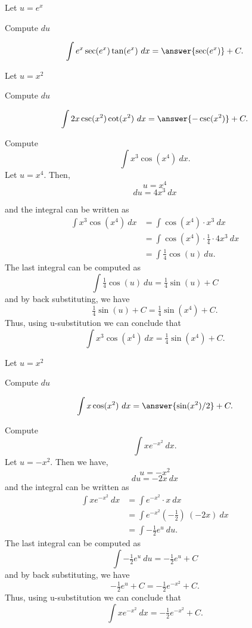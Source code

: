 \documentclass{ximera}
\begin{document}
\begin{problem}
\begin{hint}
Let $u = e^x$
\end{hint}
\begin{hint}
Compute $du$
\end{hint}
\[\int e^x\sec(e^x)\tan(e^x) \ dx = \answer{\sec(e^x)} +C.\]
\end{problem}

\begin{problem}
\begin{hint}
Let $u = x^2$
\end{hint}
\begin{hint}
Compute $du$
\end{hint}
\[\int 2x\csc(x^2)\cot(x^2) \ dx = \answer{-\csc(x^2)} +C.\]
\end{problem}

\begin{example} Compute 
\[\int x^3\cos(x^4) \ dx.\]
Let $u = x^4$.  Then,
\[u = x^4\]
\[du = 4x^3 \ dx\]

and the integral can be written as 
\begin{align*}
\int x^3\cos(x^4) \ dx &= \int \cos(x^4) \cdot x^3\  dx \\
&=  \int \cos(x^4)\cdot \tfrac14 \cdot 4x^3\  dx\\
&=  \int \tfrac14\cos(u) \ du.
\end{align*}
The last integral can be computed as 
\[\int \tfrac14 \cos(u) \ du = \tfrac14 \sin(u) + C\]
and by back substituting, we have 
\[\tfrac14 \sin(u) + C = \tfrac14 \sin(x^4) + C.\]
Thus, using u-substitution we can conclude that
\[\int x^3\cos(x^4) \ dx =  \tfrac14 \sin(x^4) + C.\]
\end{example}

\begin{problem}
\begin{hint}
Let $u = x^2$
\end{hint}
\begin{hint}
Compute $du$
\end{hint}
\[\int x\cos(x^2) \ dx = \answer{\sin(x^2)/2} +C.\]
\end{problem}


\begin{example} Compute 
\[\int xe^{-x^2} \ dx.\]
Let $u = -x^2 $.  Then we have,
\[u = -x^2\]
\[du = -2x \ dx\]
and the integral can be written as
\begin{align*}
\int xe^{-x^2} \ dx &= \int e^{-x^2} \cdot x\  dx \\
&=  \int e^{-x^2}( -\tfrac12)\ (-2x)\  dx \\
&=  \int -\tfrac12 e^u \ du.
\end{align*}
The last integral can be computed as 
\[ \int -\tfrac12 e^u \ du = -\tfrac12 e^u + C\]
and by back substituting, we have 
\[-\tfrac12 e^u + C = -\tfrac12 e^{-x^2} + C.\]
Thus, using u-substitution we can conclude that
\[\int xe^{-x^2} \ dx =  -\tfrac12 e^{-x^2} + C.\]
\end{example}
\end{document}
